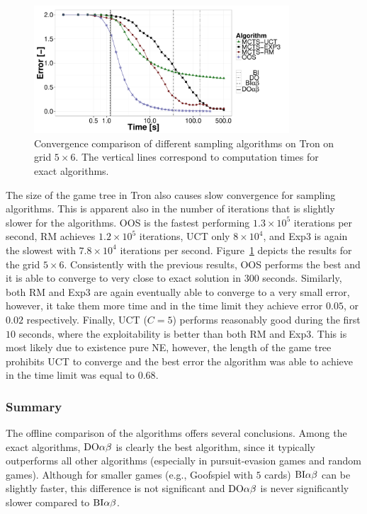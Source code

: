 \begin{figure}[t]
\centering
\includegraphics[width=0.85\textwidth]{figures/convergence-tron.pdf}
\caption{Convergence comparison of different sampling algorithms on Tron on grid $5\times6$. The vertical lines correspond to computation times for exact algorithms.} \label{fig:off:conv:tron}
\end{figure}

The size of the game tree in Tron also causes slow convergence for sampling algorithms.
This is apparent also in the number of iterations that is slightly slower for the algorithms.
OOS is the fastest performing $1.3\times 10^5$ iterations per second, RM achieves $1.2\times 10^5$ iterations, UCT only $8\times10^4$, and Exp3 is again the slowest with $7.8\times10^4$ iterations per second.
Figure~\ref{fig:off:conv:tron} depicts the results for the grid $5\times6$.
Consistently with the previous results, OOS performs the best and it is able to converge to very close to exact solution in $300$ seconds. 
Similarly, both RM and Exp3 are again eventually able to converge to a very small error, however, it take them more time and in the time limit they achieve error $0.05$, or $0.02$ respectively. 
Finally, UCT ($C=5$) performs reasonably good during the first $10$ seconds, where the exploitability is better than both RM and Exp3. 
This is most likely due to existence pure NE, however, the length of the game tree prohibits UCT to converge and the best error the algorithm was able to achieve in the time limit was equal to $0.68$.

\subsubsection{Summary}

The offline comparison of the algorithms offers several conclusions.
Among the exact algorithms, $\textrm{DO}\alpha\beta$ is clearly the best algorithm, since it typically outperforms all other algorithms (especially in pursuit-evasion games and random games). Although for smaller games (e.g., Goofspiel with $5$ cards)  $\textrm{BI}\alpha\beta$ can be slightly faster, this difference is not significant and $\textrm{DO}\alpha\beta$ is never significantly slower compared to $\textrm{BI}\alpha\beta$.

